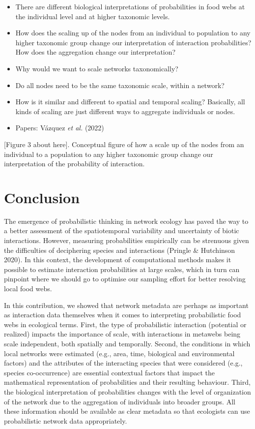 \documentclass[10pt,oneside]{article}
\begin{document}
\begin{itemize}
\tightlist
\item
  There are different biological interpretations of probabilities in
  food webs at the individual level and at higher taxonomic levels.
\item
  How does the scaling up of the nodes from an individual to population
  to any higher taxonomic group change our interpretation of interaction
  probabilities? How does the aggregation change our interpretation?
\item
  Why would we want to scale networks taxonomically?
\item
  Do all nodes need to be the same taxonomic scale, within a network?
\item
  How is it similar and different to spatial and temporal scaling?
  Basically, all kinds of scaling are just different ways to aggregate
  individuals or nodes.
\item
  Papers: Vázquez \emph{et al.} (2022)
\end{itemize}

{[}Figure 3 about here{]}. Conceptual figure of how a scale up of the
nodes from an individual to a population to any higher taxonomic group
change our interpretation of the probability of interaction.

\hypertarget{conclusion}{%
\section{Conclusion}\label{conclusion}}

The emergence of probabilistic thinking in network ecology has paved the
way to a better assessment of the spatiotemporal variability and
uncertainty of biotic interactions. However, measuring probabilities
empirically can be strenuous given the difficulties of deciphering
species and interactions (Pringle \& Hutchinson 2020). In this context,
the development of computational methods makes it possible to estimate
interaction probabilities at large scales, which in turn can pinpoint
where we should go to optimise our sampling effort for better resolving
local food webs.

In this contribution, we showed that network metadata are perhaps as
important as interaction data themselves when it comes to interpreting
probabilistic food webs in ecological terms. First, the type of
probabilistic interaction (potential or realized) impacts the importance
of scale, with interactions in metawebs being scale independent, both
spatially and temporally. Second, the conditions in which local networks
were estimated (e.g., area, time, biological and environmental factors)
and the attributes of the interacting species that were considered
(e.g., species co-occurrence) are essential contextual factors that
impact the mathematical representation of probabilities and their
resulting behaviour. Third, the biological interpretation of
probabilities changes with the level of organization of the network due
to the aggregation of individuals into broader groups. All these
information should be available as clear metadata so that ecologists can
use probabilistic network data appropriately.
\end{document}
